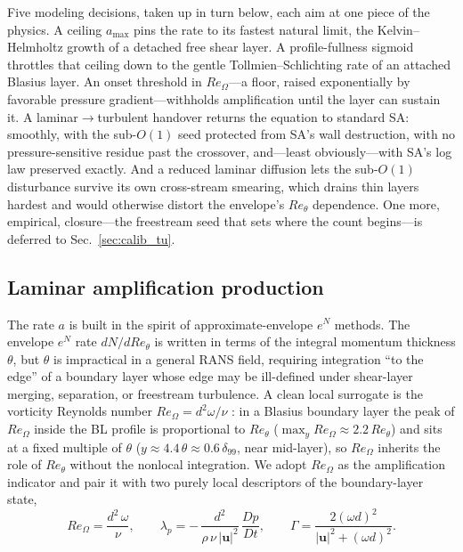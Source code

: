 \documentclass[journal]{new-aiaa}
\begin{document}
Five modeling decisions, taken up in turn below, each aim at one piece of
the physics. A ceiling $a_{\max}$ pins the rate to its fastest natural
limit, the Kelvin--Helmholtz growth of a detached free shear layer. A
profile-fullness sigmoid throttles that ceiling down to the gentle
Tollmien--Schlichting rate of an attached Blasius layer. An onset threshold
in $Re_\Omega$---a floor, raised exponentially by favorable pressure
gradient---withholds amplification until the layer can sustain it. A
laminar$\to$turbulent handover returns the equation to standard SA:
smoothly, with the sub-$O(1)$ seed protected from SA's wall destruction,
with no pressure-sensitive residue past the crossover, and---least
obviously---with SA's log law preserved exactly. And a reduced laminar
diffusion lets the sub-$O(1)$ disturbance survive its own cross-stream
smearing, which drains thin layers hardest and would otherwise distort the
envelope's $Re_\theta$ dependence. One more, empirical,
closure---the freestream seed that sets where the count begins---is
deferred to Sec.~\ref{sec:calib_tu}.

\subsection{Laminar amplification production}
The rate $a$ is built in the spirit of approximate-envelope $e^N$ methods. The
envelope $e^N$ rate $dN/dRe_\theta$ is written in terms of the integral
momentum thickness $\theta$, but $\theta$ is impractical in a general RANS field,
requiring integration ``to the edge'' of a boundary layer whose edge may be
ill-defined under shear-layer merging, separation, or freestream turbulence.
A clean local surrogate is the vorticity Reynolds number
$Re_\Omega=d^2\omega/\nu$ \cite{VanDriest1963, MenterLangtry2006, langtry_menter_2009}:
in a Blasius boundary layer the peak of $Re_\Omega$ inside the BL profile is
proportional to $Re_\theta$ ($\max_y Re_\Omega\!\approx\!2.2\,Re_\theta$) and
sits at a fixed multiple of $\theta$
($y\!\approx\!4.4\,\theta\!\approx\!0.6\,\delta_{99}$, near mid-layer), so
$Re_\Omega$ inherits the role of $Re_\theta$ without the nonlocal integration. We adopt $Re_\Omega$ as the
amplification indicator and pair it with two purely local descriptors of the
boundary-layer state,
\begin{equation}
  Re_\Omega = \frac{d^2\,\omega}{\nu}, \qquad
  \lambda_p = -\,\frac{d^{2}}{\rho\,\nu\,|\mathbf{u}|^{2}}\,\frac{Dp}{Dt}, \qquad
  \Gamma = \frac{2(\omega d)^2}{|\mathbf{u}|^2+(\omega d)^2}.
  \label{eq:indicators}
\end{equation}
\end{document}
